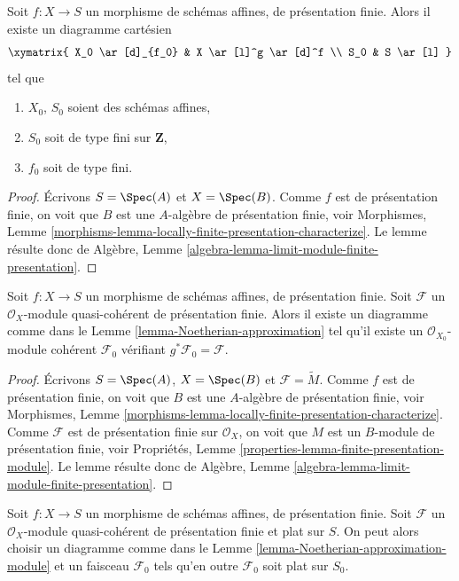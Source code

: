 \begin{lemma}
\label{lemma-Noetherian-approximation}
Soit $f : X \to S$ un morphisme de schémas affines, de
présentation finie. Alors il existe un diagramme cartésien
$$
\xymatrix{
X_0 \ar[d]_{f_0} & X \ar[l]^g \ar[d]^f \\
S_0 & S \ar[l]
}
$$
tel que
\begin{enumerate}
\item $X_0$, $S_0$ soient des schémas affines,
\item $S_0$ soit de type fini sur $\mathbf{Z}$,
\item $f_0$ soit de type fini.
\end{enumerate}
\end{lemma}

\begin{proof}
Écrivons $S = \Spec(A)$ et $X = \Spec(B)$.
Comme $f$ est de présentation finie, on voit que
$B$ est une $A$-algèbre de présentation finie, voir
Morphismes,
Lemme \ref{morphisms-lemma-locally-finite-presentation-characterize}.
Le lemme résulte donc de
Algèbre, Lemme \ref{algebra-lemma-limit-module-finite-presentation}.
\end{proof}

\begin{lemma}
\label{lemma-Noetherian-approximation-module}
Soit $f : X \to S$ un morphisme de schémas affines, de
présentation finie. Soit $\mathcal{F}$ un $\mathcal{O}_X$-module quasi-cohérent
de présentation finie. Alors il existe un diagramme comme dans le
Lemme \ref{lemma-Noetherian-approximation}
tel qu'il existe un $\mathcal{O}_{X_0}$-module cohérent $\mathcal{F}_0$
vérifiant $g^*\mathcal{F}_0 = \mathcal{F}$.
\end{lemma}

\begin{proof}
Écrivons $S = \Spec(A)$, $X = \Spec(B)$ et
$\mathcal{F} = \widetilde{M}$. Comme $f$ est de présentation finie, on voit que
$B$ est une $A$-algèbre de présentation finie, voir
Morphismes,
Lemme \ref{morphisms-lemma-locally-finite-presentation-characterize}.
Comme $\mathcal{F}$ est de présentation finie sur $\mathcal{O}_X$, on voit que
$M$ est un $B$-module de présentation finie, voir
Propriétés, Lemme \ref{properties-lemma-finite-presentation-module}.
Le lemme résulte donc de
Algèbre, Lemme \ref{algebra-lemma-limit-module-finite-presentation}.
\end{proof}

\begin{lemma}
\label{lemma-Noetherian-approximation-flat-module}
Soit $f : X \to S$ un morphisme de schémas affines, de
présentation finie. Soit $\mathcal{F}$ un $\mathcal{O}_X$-module quasi-cohérent
de présentation finie et plat sur $S$. On peut alors choisir un diagramme comme dans le
Lemme \ref{lemma-Noetherian-approximation-module}
et un faisceau $\mathcal{F}_0$ tels qu'en outre $\mathcal{F}_0$
soit plat sur $S_0$.
\end{lemma}

